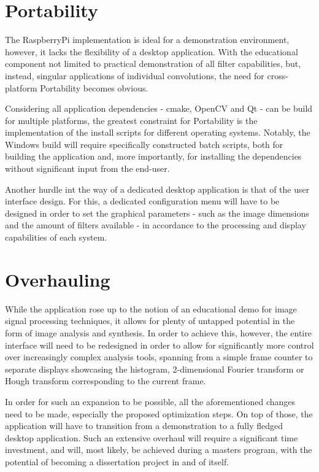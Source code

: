 \section{Portability}

The RaspberryPi implementation is ideal for a demonstration environment, however, it lacks the flexibility
of a desktop application. With the educational component not limited to practical demonstration of all 
filter capabilities, but, instead, singular applications of individual convolutions, the need for 
cross-platform Portability becomes obvious.

Considering all application dependencies - cmake, OpenCV and Qt - can be build for multiple platforms,
the greatest constraint for Portability is the implementation of the install scripts for different operating
systems. Notably, the Windows build will require specifically constructed batch scripts, both for 
building the application and, more importantly, for installing the dependencies without significant input
from the end-user.

Another hurdle int the way of a dedicated desktop application is that of the user interface design. For this, 
a dedicated configuration menu will have to be designed in order to set the graphical parameters - such as
the image dimensions and the amount of filters available - in accordance to the processing and display 
capabilities of each system.

\section{Overhauling}

While the application rose up to the notion of an educational demo for image signal processing techniques, it
allows for plenty of untapped potential in the form of image analysis and synthesis. In order to achieve this,
however, the entire interface will need to be redesigned in order to allow for significantly more control over
increasingly complex analysis tools, spanning from a simple frame counter to separate displays showcasing the
histogram, 2-dimensional Fourier transform or Hough transform corresponding to the current frame.

In order for such an expansion to be possible, all the aforementioned changes need to be made, especially the 
proposed optimization steps. On top of those, the application will have to transition from a demonstration to 
a fully fledged desktop application. Such an extensive overhaul will require a significant time investment, and 
will, most likely, be achieved during a masters program, with the potential of becoming a dissertation project 
in and of itself.
